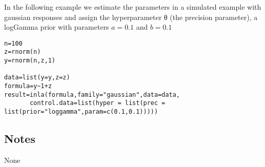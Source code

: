\documentclass[a4paper,11pt]{article}
\begin{document}
In the following example we estimate the parameters in a simulated
example with gaussian responses and assign the hyperparameter θ (the
precision parameter), a logGamma prior with parameters $a=0.1$ and
$b=0.1$


\begin{verbatim}
n=100
z=rnorm(n)
y=rnorm(n,z,1)

data=list(y=y,z=z)
formula=y~1+z
result=inla(formula,family="gaussian",data=data,
       control.data=list(hyper = list(prec = list(prior="loggamma",param=c(0.1,0.1)))))
\end{verbatim}

\subsection*{Notes}
None
\end{document}
